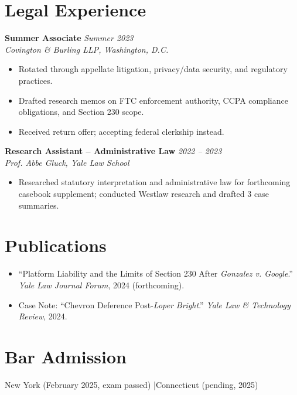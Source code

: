 \documentclass[11pt,a4paper]{article}
\begin{document}
\section{Legal Experience}

\noindent\textbf{Summer Associate} \hfill \textit{Summer 2023}\\
\textit{Covington \& Burling LLP, Washington, D.C.}
\begin{itemize}
  \item Rotated through appellate litigation, privacy/data security, and regulatory practices.
  \item Drafted research memos on FTC enforcement authority, CCPA compliance obligations, and Section 230 scope.
  \item Received return offer; accepting federal clerkship instead.
\end{itemize}

\vspace{4pt}
\noindent\textbf{Research Assistant -- Administrative Law} \hfill \textit{2022 -- 2023}\\
\textit{Prof. Abbe Gluck, Yale Law School}
\begin{itemize}
  \item Researched statutory interpretation and administrative law for forthcoming casebook supplement; conducted Westlaw research and drafted 3 case summaries.
\end{itemize}

\section{Publications}
\begin{itemize}
  \item ``Platform Liability and the Limits of Section 230 After \textit{Gonzalez v. Google}.'' \textit{Yale Law Journal Forum}, 2024 (forthcoming).
  \item Case Note: ``Chevron Deference Post-\textit{Loper Bright}.'' \textit{Yale Law \& Technology Review}, 2024.
\end{itemize}

\section{Bar Admission}
New York (February 2025, exam passed) \quad|\quad Connecticut (pending, 2025)
\end{document}
